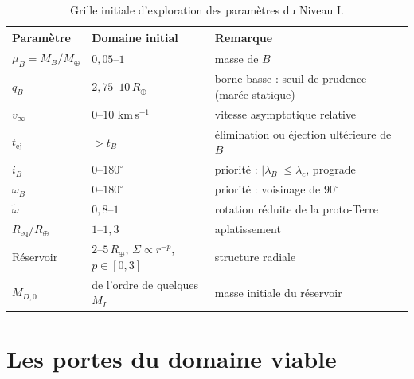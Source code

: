 \documentclass[11pt,a4paper,openany]{report}
\newcommand{\Mt}{M_{\oplus}}
\newcommand{\Rt}{R_{\oplus}}
\newcommand{\Req}{R_{\mathrm{eq}}}
\begin{document}
\begin{table}[htbp]
\centering
\small
\caption{Grille initiale d'exploration des paramètres du Niveau I.}
\label{tab:grille}
\begin{tabular}{lll}
\toprule
\textbf{Paramètre} & \textbf{Domaine initial} & \textbf{Remarque} \\
\midrule
$\mu_B=M_B/\Mt$ & $0{,}05$--$1$ & masse de $B$ \\
$q_B$ & $2{,}75$--$10\,\Rt$ & borne basse : seuil de prudence (marée statique) \\
$v_\infty$ & $0$--$10$ km\,s$^{-1}$ & vitesse asymptotique relative \\
$t_{\mathrm{ej}}$ & $>t_B$ & élimination ou éjection ultérieure de $B$ \\
$i_B$ & $0$--$180^\circ$ & priorité : $|\lambda_B|\le\lambda_c$, prograde \\
$\omega_B$ & $0$--$180^\circ$ & priorité : voisinage de $90^\circ$ \\
$\tilde\omega$ & $0{,}8$--$1$ & rotation réduite de la proto-Terre \\
$\Req/\Rt$ & $1$--$1{,}3$ & aplatissement \\
Réservoir & $2$--$5\,\Rt$, $\Sigma\propto r^{-p}$, $p\in[0,3]$ & structure radiale \\
$M_{D,0}$ & de l'ordre de quelques $M_L$ & masse initiale du réservoir \\
\bottomrule
\end{tabular}
\end{table}

\section{Les portes du domaine viable}

\end{document}
